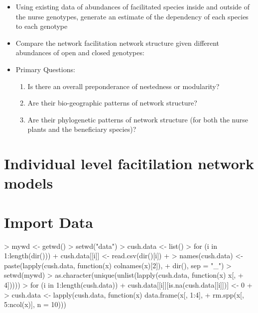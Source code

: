 \documentclass[12pt]{article}
\begin{document}
\begin{itemize}
\item Using existing data of abundances of facilitated species inside
  and outside of the nurse genotypes, generate an estimate of the
  dependency of each species to each genotype

\item Compare the network facilitation network structure given
  different abundances of open and closed genotypes:

\item Primary Questions:
  \begin{enumerate}
  \item Is there an overall preponderance of nestedness or modularity?
  \item Are their bio-geographic patterns of network structure?
  \item Are their phylogenetic patterns of network structure (for both
    the nurse plants and the beneficiary species)?
  \end{enumerate}
\end{itemize}


\section{Individual level facitilation network models}

 




\section{Import Data}


\begin{Schunk}
\begin{Sinput}
> mywd <- getwd()
> setwd("data")
> cush.data <- list()
> for (i in 1:length(dir())) {
+     cush.data[[i]] <- read.csv(dir()[i])
+ }
> names(cush.data) <- paste(lapply(cush.data, function(x) colnames(x)[2]), 
+     dir(), sep = "_")
> setwd(mywd)
> as.character(unique(unlist(lapply(cush.data, function(x) x[, 
+     4]))))
> for (i in 1:length(cush.data)) {
+     cush.data[[i]][is.na(cush.data[[i]])] <- 0
+ }
> cush.data <- lapply(cush.data, function(x) data.frame(x[, 1:4], 
+     rm.spp(x[, 5:ncol(x)], n = 10)))
\end{Sinput}
\end{Schunk}
\end{document}
